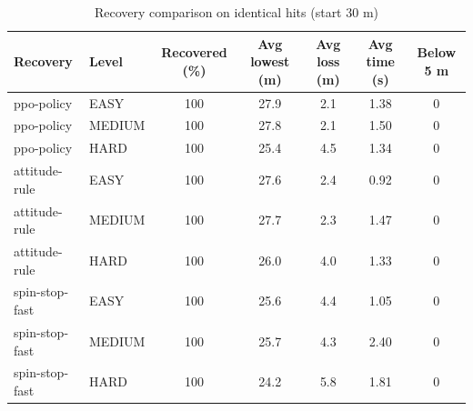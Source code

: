 \begin{table}[h]
\centering
\caption{Recovery comparison on identical hits (start 30 m)}
\begin{tabular}{llccccc}
\hline
Recovery & Level & Recovered (\%) & Avg lowest (m) & Avg loss (m) & Avg time (s) & Below 5 m \\
\hline
ppo-policy & EASY & 100 & 27.9 & 2.1 & 1.38 & 0 \\
ppo-policy & MEDIUM & 100 & 27.8 & 2.1 & 1.50 & 0 \\
ppo-policy & HARD & 100 & 25.4 & 4.5 & 1.34 & 0 \\
\hline
attitude-rule & EASY & 100 & 27.6 & 2.4 & 0.92 & 0 \\
attitude-rule & MEDIUM & 100 & 27.7 & 2.3 & 1.47 & 0 \\
attitude-rule & HARD & 100 & 26.0 & 4.0 & 1.33 & 0 \\
\hline
spin-stop-fast & EASY & 100 & 25.6 & 4.4 & 1.05 & 0 \\
spin-stop-fast & MEDIUM & 100 & 25.7 & 4.3 & 2.40 & 0 \\
spin-stop-fast & HARD & 100 & 24.2 & 5.8 & 1.81 & 0 \\
\hline
\end{tabular}
\end{table}
